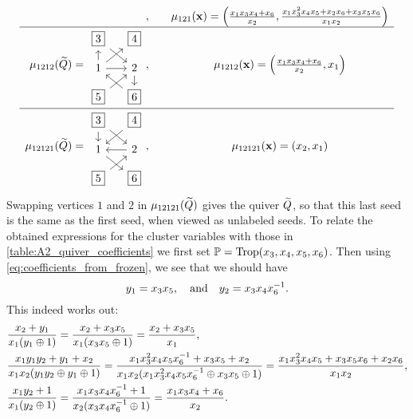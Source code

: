 \begin{example}
{\begin{equation*}
\begin{array}{rc}
\begin{tikzcd}[sep=small, ampersand replacement=\&]
					                 \end{tikzcd},\quad                                                  &
					\mu_{121}(\bx) = \left(\frac{x_{1} x_{3} x_{4} + x_{6}}{x_{2}}, \frac{x_{1} x_{3}^{2} x_{4} x_{5} + x_{2} x_{6} + x_{3} x_{5} x_{6}}{x_{1} x_{2}}\right) \\
					\hline
					\mu_{1212}(\tQ) = \begin{tikzcd}[sep=small, ampersand replacement=\&]
						                  \boxed{3} \ar[dr] \& \boxed{4}  \\
						                  1  \uar \rar \urar \& 2 \dar \\
						                  \boxed{5} \urar \& \boxed{6} \ular
					                  \end{tikzcd},\quad                                                 &
					\mu_{1212}(\bx) = \left(\frac{x_{1} x_{3} x_{4} + x_{6}}{x_{2}}, x_1\right)                                                                              \\
					\hline
					\mu_{12121}(\tQ) = \begin{tikzcd}[sep=small, ampersand replacement=\&]
						                   \boxed{3} \dar \drar \& \boxed{4} \dlar \\
						                   1  \drar \& 2 \lar  \\
						                   \boxed{5}\urar \& \boxed{6}
					                   \end{tikzcd},\quad                                                &
					\mu_{12121}(\bx) = \left(x_2, x_1\right)
				\end{array}
			\end{equation*}
		}%
	Swapping vertices $1$ and $2$ in $\mu_{12121}(\widetilde{Q})$ gives the quiver $\widetilde{Q}$, so that
	this last seed is the same as the first seed, when viewed as unlabeled seeds. To relate
	the obtained expressions for the cluster variables with those in
	\cref{table:A2_quiver_coefficients} we first set $\mathbb{P} = \operatorname{Trop}(x_3, x_4, x_5, x_6)$.
	Then using \cref{eq:coefficients_from_frozen}, we see that we should have
	\begin{equation*}
		y_1 = x_3x_5, \quad \text{and} \quad y_2 = x_3x_4x_6^{-1}.
	\end{equation*}
	This indeed works out:
	\begin{align*}
		 & \frac{x_2 + y_1}{x_1(y_1 \oplus 1)} = \frac{x_2 + x_3 x_5}{x_1(x_3x_5\oplus 1)} = \frac{x_2 + x_3 x_5}{x_1},                                                                                                                       \\
		 & \frac{x_1y_1y_2 + y_1 + x_2}{x_1x_2(y_1y_2 \oplus y_1 \oplus 1)} = \frac{x_1x_3^2x_4x_5x_6^{-1} + x_3x_5 + x_2}{x_1x_2(x_1x_3^2x_4x_5x_6^{-1} \oplus x_3 x_5 \oplus 1)} = \frac{x_1 x_3^2 x_4 x_5 + x_3 x_5 x_6 + x_2 x_6}{x_1 x_2}, \\
		 & \frac{x_1 y_2 + 1}{x_1 (y_2 \oplus 1)} = \frac{x_1 x_3 x_4 x_6^{-1} + 1}{x_2 (x_3 x_4 x_6^{-1} \oplus 1)} = \frac{x_1 x_3 x_4 + x_6}{x_2}.
	\end{align*}
\end{example}

